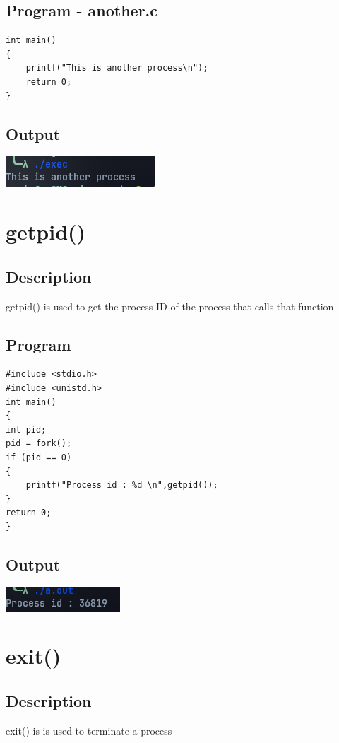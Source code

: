 \subsection{Program - another.c}
\begin{lstlisting}[label={list:c_program:exec2}]
int main()
{
    printf("This is another process\n");
    return 0;
}
\end{lstlisting}
\subsection{Output}
\includegraphics[]{Cycle_1//Outputs/exec.png}

\section{getpid()}
\subsection{Description}
getpid() is used to get the process ID of the process that calls that function
\subsection{Program}
\begin{lstlisting}[label={list:c_program:fork}]
#include <stdio.h>
#include <unistd.h>
int main()
{
int pid;
pid = fork();
if (pid == 0)
{
    printf("Process id : %d \n",getpid());  
}
return 0;
}
\end{lstlisting}

\subsection{Output}
\includegraphics[]{Cycle_1//Outputs/getpid.png}

\section{exit()}
\subsection{Description}
exit() is is used to terminate a process
